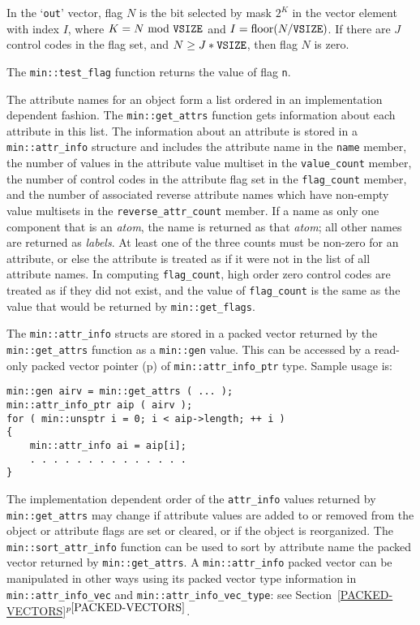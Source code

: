 \documentclass[12pt]{article}
\newcommand{\itemref}[1]{\ref{#1}$^{p\pageref{#1}}$}
\newcommand{\pagref}[1]{p\pageref{#1}}
\newcommand{\EOL}{\penalty \exhyphenpenalty}
\newenvironment{indpar}[1][0.3in]%
	{\begin{list}{}%
		     {\setlength{\itemsep}{0in}%
		      \setlength{\topsep}{0in}%
		      \setlength{\parsep}{1ex}%
		      \setlength{\labelwidth}{#1}%
		      \setlength{\leftmargin}{#1}%
		      \addtolength{\leftmargin}{\labelsep}}%
	 \item}%
	{\end{list}}
\begin{document}
In the `{\tt out}' vector, flag $N$ is the bit selected by mask $2^K$
in the vector element with index $I$, where $K=N~\mbox{mod}~\mbox{\tt VSIZE}$
and $I=\mbox{floor}(N/\mbox{\tt VSIZE})$.
If there are $J$ control codes
in the flag set, and $N\geq J*\mbox{\tt VSIZE}$, then
flag $N$ is zero.

The {\tt min::\EOL test\_\EOL flag} function returns the value
of flag {\tt n}.

The attribute names for an object form a list ordered in an implementation
dependent fashion.  
The {\tt min::\EOL get\_\EOL attrs} function gets information about each
attribute in this list.  The information about an attribute is stored in a
{\tt min::\EOL attr\_\EOL info} structure and includes the attribute
name in the {\tt name} member,
the number of values in the attribute value multiset in the {\tt value\_count}
member, the number of control codes in the attribute flag set in
the {\tt flag\_count} member, and the number of associated
reverse attribute names which have non-empty value multisets in the
{\tt reverse\_attr\_count} member.
If a name as only one component that is an {\em atom}, the name is returned
as that {\em atom}; all other names are returned as {\em labels}.
At least one of the three counts must be
non-zero for an attribute, or else the attribute is treated as if it
were not in the list of all attribute names.  In computing
{\tt flag\_count}, high order zero control codes are treated as if they
did not exist, and the value of {\tt flag\_count} is the
same as the value that would be returned by {\tt min::\EOL get\_\EOL flags}.

The {\tt min::\EOL attr\_\EOL info} structs are stored in a packed vector
returned by the {\tt min::\EOL get\_\EOL attrs} function
as a \verb|min::gen| value.  This can be accessed by a read-only
packed vector pointer (\pagref{MIN::PACKED_VEC_PTR_OF_GEN})
of {\tt min::\EOL attr\_\EOL info\_\EOL ptr} type.
Sample usage is:
\begin{indpar}\begin{verbatim}
min::gen airv = min::get_attrs ( ... );
min::attr_info_ptr aip ( airv );
for ( min::unsptr i = 0; i < aip->length; ++ i )
{
    min::attr_info ai = aip[i];
    . . . . . . . . . . . . . .
}
\end{verbatim}\end{indpar}\label{ATTR-INFO-POINTER-EXAMPLE}

The implementation dependent order of the \verb|attr_info|
values returned by {\tt min::\EOL get\_\EOL attrs} may change if attribute
values are added to or removed from the object or
attribute flags are set or cleared, or if the object is reorganized.
The {\tt min::\EOL sort\_\EOL attr\_\EOL info} function can be used
to sort by attribute name
the packed vector returned by {\tt min::\EOL get\_\EOL attrs}.
A {\tt min::\EOL attr\_\EOL info} packed vector can be manipulated in other
ways using its packed vector type information in
{\tt min::\EOL attr\_\EOL info\_\EOL vec}
and {\tt min::\EOL attr\_\EOL info\_\EOL vec\_\EOL type}:
see Section~\itemref{PACKED-VECTORS}.
\end{document}
